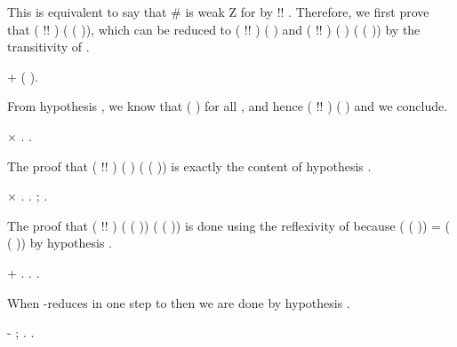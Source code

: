 This is equivalent to say that  \#  is weak Z for  by  !\coqdocvar{\_}! . Therefore, we first prove that  ( !\coqdocvar{\_}! )  ( ( )), which can be reduced to  ( !\coqdocvar{\_}! )  ( ) and  ( !\coqdocvar{\_}! ) ( ) ( ( )) by the transitivity of . \begin{coqdoccode}
\coqdocemptyline
\coqdocindent{2.00em}
+    ( ).\coqdoceol
\coqdocemptyline
\end{coqdoccode}
From hypothesis , we know that    ( ) for all , and hence  ( !\coqdocvar{\_}! )  ( ) and we conclude.\begin{coqdoccode}
\coqdocemptyline
\coqdocindent{3.00em}
\ensuremath{\times}  .  .\coqdoceol
\coqdocemptyline
\end{coqdoccode}
The proof that  ( !\coqdocvar{\_}! ) ( ) ( ( )) is exactly the content of hypothesis .  \begin{coqdoccode}
\coqdocemptyline
\coqdocindent{3.00em}
\ensuremath{\times}    .  .    ; .\coqdoceol
\coqdocemptyline
\end{coqdoccode}
The proof that  ( !\coqdocvar{\_}! ) ( ( )) ( ( )) is done using the reflexivity of  because  ( ( )) = ( ( )) by hypothesis . \begin{coqdoccode}
\coqdocemptyline
\coqdocindent{2.00em}
+    .  .  .\coqdoceol
\coqdocemptyline
\end{coqdoccode}
When  -reduces in one step to  then we are done by hypothesis . \begin{coqdoccode}
\coqdocemptyline
\coqdocindent{1.00em}
-  ; . .\coqdoceol
\coqdocemptyline
\end{coqdoccode}
